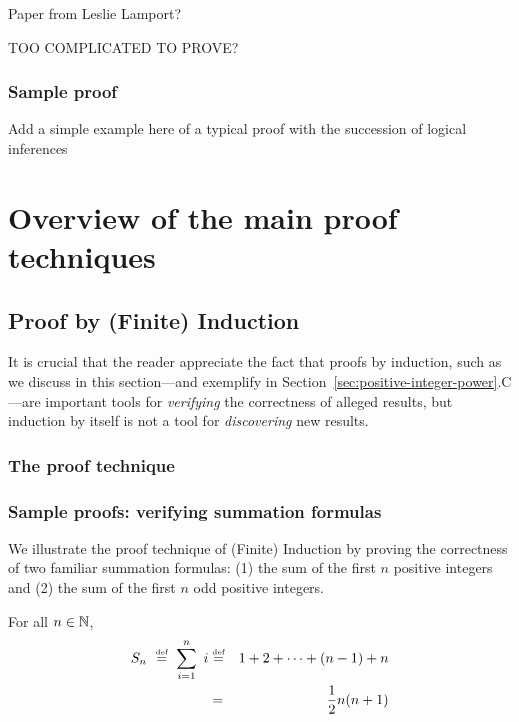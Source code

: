 Paper from Leslie Lamport?

TOO COMPLICATED TO PROVE?

\subsubsection{Sample proof}
\label{sec:sample-proofs}


{\Denis Add a simple example here of a typical proof 
with the succession of logical inferences}



\section{Overview of the main proof techniques}

\subsection{Proof by (Finite) Induction}
\label{sec:Induction}

It is crucial that the reader appreciate the fact that proofs by
induction, such as we discuss in this section---and exemplify in
Section~\ref{sec:positive-integer-power}.C---are important tools for
{\em verifying} the correctness of alleged results, but induction by
itself is not a tool for {\em discovering} new results.


\subsubsection{The proof technique}


\subsubsection{Sample proofs: verifying summation formulas}
\label{sec:Proof-Induction}


We illustrate the proof technique of (Finite) Induction by proving the
correctness of two familiar summation formulas: (1) the sum of the
first $n$ positive integers and (2) the sum of the first $n$ odd
positive integers.

\begin{prop}
\label{thm:sum-1-to-n-induction1}
For all $n \in \mathbb{N}$,
\begin{eqnarray}
\nonumber
S_n \ \stackrel{\mbox{{\tiny def}}}{=} \ \sum_{i=1}^n \ i
 & \stackrel{\mbox{{\tiny def}}}{=} &
 1 + 2 + \cdots + (n-1) + n \\
\label{eq:sum-first-n1}
 & = & {1 \over 2} n (n+1) \\
\end{eqnarray}
\end{prop}

